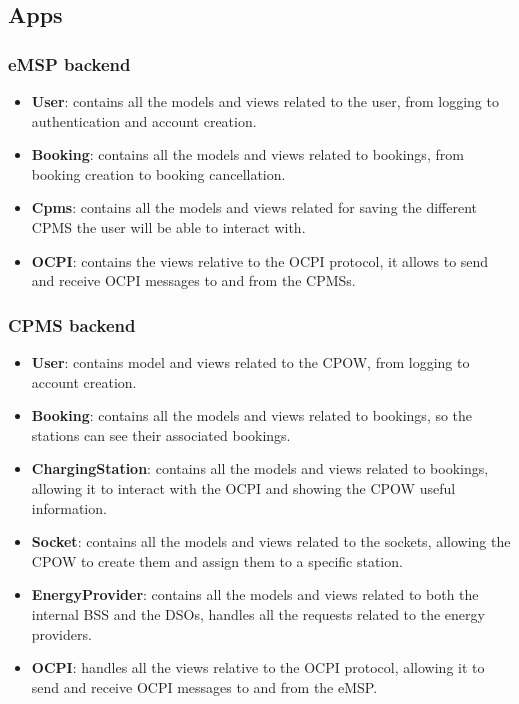 \documentclass[table, 12pt]{article}
\begin{document}
\subsection{Apps}
\subsubsection{eMSP backend}
\begin{itemize}
    \item \textbf{User}: contains all the models and views related to the user, from logging to authentication and account creation.
    \item \textbf{Booking}: contains all the models and views related to bookings, from booking creation to booking cancellation.
    \item \textbf{Cpms}: contains all the models and views related for saving the different CPMS the user will be able to interact with.
    \item \textbf{OCPI}: contains the views relative to the OCPI protocol, it allows to send and receive OCPI messages to and from the CPMSs.
\end{itemize}

\subsubsection{CPMS backend}
\begin{itemize}
    \item \textbf{User}: contains model and views related to the CPOW, from logging to account creation.
    \item \textbf{Booking}: contains all the models and views related to bookings, so the stations can see their associated bookings.
    \item \textbf{ChargingStation}: contains all the models and views related to bookings, allowing it to interact with the OCPI and showing the CPOW useful information.
    \item \textbf{Socket}: contains all the models and views related to the sockets, allowing the CPOW to create them and assign them to a specific station.
    \item \textbf{EnergyProvider}: contains all the models and views related to both the internal BSS and the DSOs, handles all the requests related to the energy providers.
    \item \textbf{OCPI}: handles all the views relative to the OCPI protocol, allowing it to send and receive OCPI messages to and from the eMSP.
\end{itemize}
\end{document}
